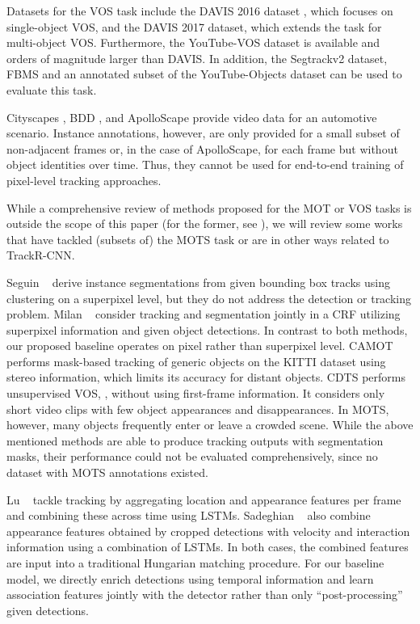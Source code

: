 \documentclass[10pt,twocolumn,letterpaper]{article}
\newcommand{\PAR}[1]{\vskip1pt \noindent {\bf #1~}}
\newcounter{row}
\begin{document}
Datasets for the VOS task include the DAVIS 2016 dataset \cite{DAVIS2016}, which focuses on single-object VOS, and the DAVIS 2017 \cite{DAVIS2017} dataset, which extends the task for multi-object VOS. Furthermore, the YouTube-VOS dataset \cite{Xu18ECCV} is available and orders of magnitude larger than DAVIS. In addition, the Segtrackv2 \cite{Segtrackv2} dataset, FBMS \cite{Ochs14TPAMI} and an annotated subset of the YouTube-Objects dataset \cite{YoutubeObjectsOriginal, YoutubeObjectsSegmentation} can be used to evaluate this task.


\PAR{Video Instance Segmentation Datasets.}
Cityscapes \cite{Cordts16CVPR}, BDD \cite{Yu18Arxiv}, and ApolloScape \cite{ApolloScape} provide video data for an automotive scenario. Instance annotations, however, are only provided for a small subset of non-adjacent frames or, in the case of ApolloScape, for each frame but without object identities over time.
Thus, they cannot be used for end-to-end training of pixel-level tracking approaches.

\PAR{Methods.}
While a comprehensive review of methods proposed for the MOT or VOS tasks is outside the scope of this paper (for the former, see \eg \cite{leal2017tracking}), we will review some works that have tackled (subsets of) the MOTS task or are in other ways related to TrackR-CNN. 

Seguin \etal~\cite{seguin2016instance} derive instance segmentations from given bounding box tracks using clustering on a superpixel level, but they do not address the detection or tracking problem.
Milan \etal~\cite{Milan15CVPR} consider tracking and segmentation jointly in a CRF utilizing superpixel information and given object detections. In contrast to both methods, our proposed baseline operates on pixel rather than superpixel level.
CAMOT \cite{Osep18ICRA} performs mask-based tracking of generic objects on the KITTI dataset using stereo information, which limits its accuracy for distant objects.
CDTS \cite{Koh17ICCV} performs unsupervised VOS, \ie, without using first-frame information. It considers only short video clips with few object appearances and disappearances. In MOTS, however, many objects frequently enter or leave a crowded scene. While the above mentioned methods are able to produce tracking outputs with segmentation masks, their performance could not be evaluated comprehensively, since no dataset with MOTS annotations existed.

Lu \etal~\cite{Lu17ICCV} tackle tracking by aggregating location and appearance features per frame and combining these across time using LSTMs. Sadeghian \etal~\cite{Sadeghian17ICCV} also combine appearance features obtained by cropped detections with velocity and interaction information using a combination of LSTMs.
In both cases, the combined features are input into a traditional Hungarian matching procedure. For our baseline model, we directly enrich detections using temporal information and learn association features jointly with the detector rather than only ``post-processing'' given detections. 
\end{document}
